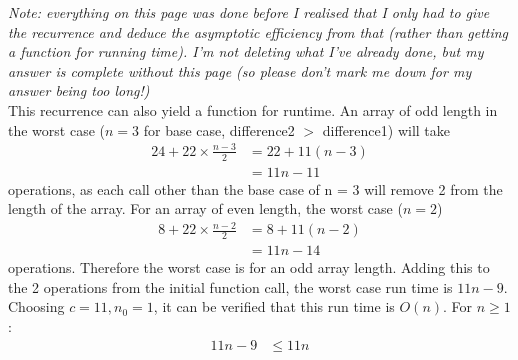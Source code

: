 \documentclass{article}
\begin{document}
	\newpage
	\textit{Note: everything on this page was done before I realised that I only had to give the recurrence and deduce the asymptotic efficiency from that (rather than getting a function for running time). I'm not deleting what I've already done, but my answer is complete without this page (so please don't mark me down for my answer being too long!)}
	\newline \\
	This recurrence can also yield a function for runtime. An array of odd length in the worst case ($n = 3$ for base case, difference2 $>$ difference1) will take 
	\begin{align*}
		24 + 22 \times \frac{n - 3}{2} &= 22 + 11 (n - 3) \\
		&= 11n - 11
	\end{align*}
	operations, as each call other than the base case of n = 3 will remove 2 from the length of the array. For an array of even length, the worst case ($n = 2$) 
	\begin{align*}
		8 + 22 \times \frac{n - 2}{2} &= 8 + 11 (n - 2) \\
		&= 11n - 14
	\end{align*}
	operations. Therefore the worst case is for an odd array length. Adding this to the 2 operations from the initial function call, the worst case run time is $11n - 9$. Choosing $c = 11, n_0 = 1$, it can be verified that this run time is $O(n)$. For $n \ge 1$:
	\begin{align*}
		11n - 9 &\le 11n
	\end{align*}
\end{document}
